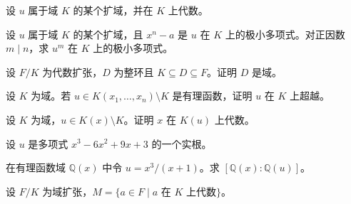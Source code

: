 \newpage
\noindent\begin{minipage}{\textwidth}
设 $u$ 属于域 $K$ 的某个扩域，并在 $K$ 上代数。
\end{minipage}\par\vfill
\noindent\begin{minipage}{\textwidth}
设 $u$ 属于域 $K$ 的某个扩域，且 $x^n-a$ 是 $u$ 在 $K$ 上的极小多项式。对正因数 $m\mid n$，求 $u^m$ 在 $K$ 上的极小多项式。
\end{minipage}\par\vfill
\noindent\begin{minipage}{\textwidth}
设 $F/K$ 为代数扩张，$D$ 为整环且 $K\subseteq D\subseteq F$。证明 $D$ 是域。
\end{minipage}\par\vfill
\newpage
\noindent\begin{minipage}{\textwidth}
设 $K$ 为域。若 $u\in K(x_1,\ldots,x_n)\setminus K$ 是有理函数，证明 $u$ 在 $K$ 上超越。
\end{minipage}\par\vfill
\noindent\begin{minipage}{\textwidth}
设 $K$ 为域，$u\in K(x)\setminus K$。证明 $x$ 在 $K(u)$ 上代数。
\end{minipage}\par\vfill
\noindent\begin{minipage}{\textwidth}
设 $u$ 是多项式 $x^3-6x^2+9x+3$ 的一个实根。
\end{minipage}\par\vfill
\newpage
\noindent\begin{minipage}{\textwidth}
在有理函数域 $\mathbb{Q}(x)$ 中令 $u=x^3/(x+1)$。求 $[\mathbb{Q}(x):\mathbb{Q}(u)]$。
\end{minipage}\par\vfill
\noindent\begin{minipage}{\textwidth}
设 $F/K$ 为域扩张，$M=\{a\in F\mid a\text{ 在 }K\text{ 上代数}\}$。
\end{minipage}\par\vfill
